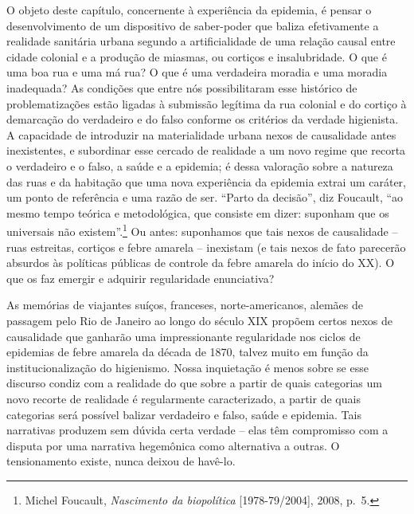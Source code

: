 O objeto deste capítulo, concernente à experiência da epidemia, é pensar
o desenvolvimento de um dispositivo de saber-poder que baliza
efetivamente a realidade sanitária urbana segundo a artificialidade de
uma relação causal entre cidade colonial e a produção de miasmas, ou
cortiços e insalubridade. O que é uma boa rua e uma má rua? O que é uma
verdadeira moradia e uma moradia inadequada? As condições que entre nós
possibilitaram esse histórico de problematizações estão ligadas à
submissão legítima da rua colonial e do cortiço à demarcação do
verdadeiro e do falso conforme os critérios da verdade higienista. A
capacidade de introduzir na materialidade urbana nexos de causalidade
antes inexistentes, e subordinar esse cercado de realidade a um novo
regime que recorta o verdadeiro e o falso, a saúde e a epidemia; é dessa
valoração sobre a natureza das ruas e da habitação que uma nova
experiência da epidemia extrai um caráter, um ponto de referência e uma
razão de ser. ``Parto da decisão'', diz Foucault, ``ao mesmo tempo
teórica e metodológica, que consiste em dizer: suponham que os
universais não existem''.\footnote{Michel Foucault, \emph{Nascimento da
  biopolítica} {[}1978-79/2004{]}, 2008, p.~5.} Ou antes: suponhamos que
tais nexos de causalidade -- ruas estreitas, cortiços e febre amarela --
inexistam (e tais nexos de fato parecerão absurdos às políticas públicas
de controle da febre amarela do início do XX). O que os faz emergir e
adquirir regularidade enunciativa?

As memórias de viajantes suíços, franceses, norte-americanos, alemães de
passagem pelo Rio de Janeiro ao longo do século XIX propõem certos nexos
de causalidade que ganharão uma impressionante regularidade nos ciclos
de epidemias de febre amarela da década de 1870, talvez muito em função
da institucionalização do higienismo. Nossa inquietação é menos sobre se
esse discurso condiz com a realidade do que sobre a partir de quais
categorias um novo recorte de realidade é regularmente caracterizado, a
partir de quais categorias será possível balizar verdadeiro e falso,
saúde e epidemia. Tais narrativas produzem sem dúvida certa verdade --
elas têm compromisso com a disputa por uma narrativa hegemônica como
alternativa a outras. O tensionamento existe, nunca deixou de havê-lo.

